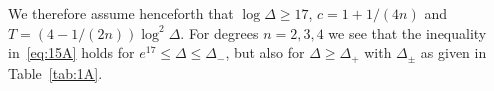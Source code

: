 \documentclass[a4paper,11pt]{amsart}
\theoremstyle{remark}
\begin{document}
%
We therefore assume henceforth that $\log\Delta\geq 17$, $c=1+1/(4n)$ and $T=(4-1/(2n))\log^2\Delta$.
%
For degrees $n=2,3,4$ we see that the inequality in~\eqref{eq:15A} holds for $e^{17}\leq \Delta \leq
\Delta_-$, but also for $\Delta \geq \Delta_+$ with $\Delta_\pm$ as given in Table~\ref{tab:1A}.
%
%
%
%
\end{document}
